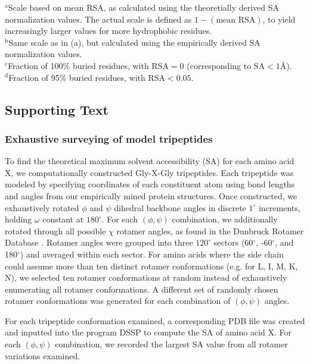 \documentclass[12pt]{article}
\begin{document}
{\small
\noindent
$^\text{a}$Scale based on mean RSA, as calculated using the theoretially derived SA normalization values. The actual scale is defined as $1-(\text{mean RSA})$, to yield increasingly larger values for more hydrophobic residues.\\
$^\text{b}$Same scale as in (a), but calculated using the empirically derived SA normalization values.\\
$^\text{c}$Fraction of 100\% buried residues, with $\text{RSA}=0$ (corresponding to $\text{SA}<1\text{\AA}$).\\
$^\text{d}$Fraction of 95\% buried residues, with $\text{RSA}<0.05$.
}

\newpage

\subsection*{Supporting Text}

\subsubsection*{Exhaustive surveying of model tripeptides}

To find the theoretical maximum solvent accessibility (SA) for each amino acid X, we computationally constructed Gly-X-Gly tripeptides. Each tripeptide was modeled by specifying coordinates of each constituent atom using bond lengths and angles from our empirically mined protein structures. Once constructed, we exhaustively rotated $\phi$ and $\psi$ dihedral backbone angles in discrete $1^\circ$ increments, holding $\omega$ constant at $180^\circ$. For each $(\phi, \psi)$ combination, we additionally rotated through all possible $\chi$ rotamer angles, as found in the Dunbruck Rotamer Database \cite{WangDunbrack2003}. Rotamer angles were grouped into three $120^\circ$ sectors (60$^\circ$, -60$^\circ$, and 180$^\circ$) and averaged within each sector. For amino acids where the side chain could assume more than ten distinct rotamer conformations (e.g. for L, I, M, K, N), we selected ten rotamer conformations at random instead of exhaustively enumerating all rotamer conformations. A different set of randomly chosen rotamer conformations was generated for each combination of $(\phi, \psi)$ angles. 

For each tripeptide conformation examined, a corresponding PDB file was created and inputted into the program DSSP \cite{Kabsch1983} to compute the SA of amino acid X. For each $(\phi, \psi)$ combination, we recorded the largest SA value from all rotamer variations examined.
\end{document}

